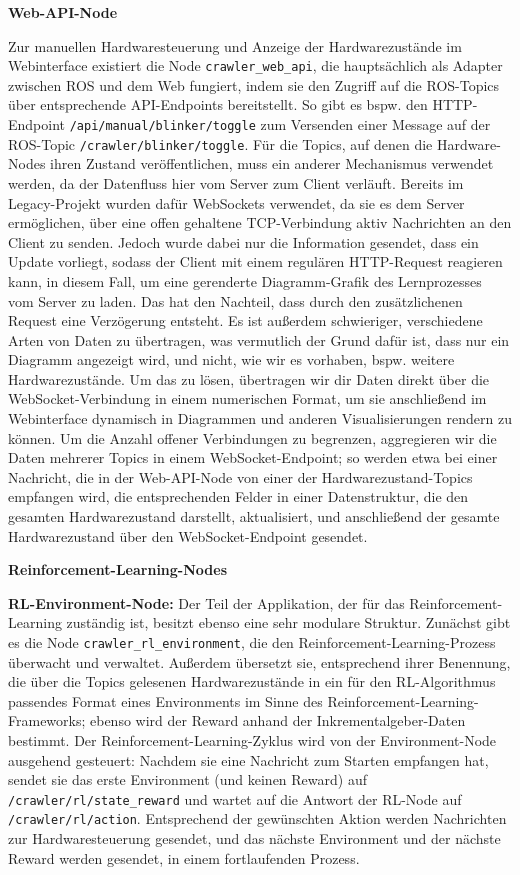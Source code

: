 \textbf{Web-API-Node}

Zur manuellen Hardwaresteuerung und Anzeige der Hardwarezustände im Webinterface existiert die Node \texttt{crawler\_web\_api}, die hauptsächlich als Adapter zwischen ROS und dem Web fungiert, indem sie den Zugriff auf die ROS-Topics über entsprechende API-Endpoints bereitstellt. So gibt es bspw. den HTTP-Endpoint \texttt{/api/manual/blinker/toggle} zum Versenden einer Message auf der ROS-Topic \texttt{/crawler/blinker/toggle}. Für die Topics, auf denen die Hardware-Nodes ihren Zustand veröffentlichen, muss ein anderer Mechanismus verwendet werden, da der Datenfluss hier vom Server zum Client verläuft. Bereits im Legacy-Projekt wurden dafür WebSockets verwendet, da sie es dem Server ermöglichen, über eine offen gehaltene TCP-Verbindung aktiv Nachrichten an den Client zu senden. Jedoch wurde dabei nur die Information gesendet, dass ein Update vorliegt, sodass der Client mit einem regulären HTTP-Request reagieren kann, in diesem Fall, um eine gerenderte Diagramm-Grafik des Lernprozesses vom Server zu laden. Das hat den Nachteil, dass durch den zusätzlichenen Request eine Verzögerung entsteht. Es ist außerdem schwieriger, verschiedene Arten von Daten zu übertragen, was vermutlich der Grund dafür ist, dass nur ein Diagramm angezeigt wird, und nicht, wie wir es vorhaben, bspw. weitere Hardwarezustände. Um das zu lösen, übertragen wir dir Daten direkt über die WebSocket-Verbindung in einem numerischen Format, um sie anschließend im Webinterface dynamisch in Diagrammen und anderen Visualisierungen rendern zu können. Um die Anzahl offener Verbindungen zu begrenzen, aggregieren wir die Daten mehrerer Topics in einem WebSocket-Endpoint; so werden etwa bei einer Nachricht, die in der Web-API-Node von einer der Hardwarezustand-Topics empfangen wird, die entsprechenden Felder in einer Datenstruktur, die den gesamten Hardwarezustand darstellt, aktualisiert, und anschließend der gesamte Hardwarezustand über den WebSocket-Endpoint gesendet. 

\textbf{Reinforcement-Learning-Nodes}

\textbf{RL-Environment-Node:} Der Teil der Applikation, der für das Reinforcement-Learning zuständig ist, besitzt ebenso eine sehr modulare Struktur. Zunächst gibt es die Node \texttt{crawler\_rl\_environment}, die den Reinforcement-Learning-Prozess überwacht und verwaltet. Außerdem übersetzt sie, entsprechend ihrer Benennung, die über die Topics gelesenen Hardwarezustände in ein für den RL-Algorithmus passendes Format eines Environments im Sinne des Reinforcement-Learning-Frameworks; ebenso wird der Reward anhand der Inkrementalgeber-Daten bestimmt. Der Reinforcement-Learning-Zyklus wird von der Environment-Node ausgehend gesteuert: Nachdem sie eine Nachricht zum Starten empfangen hat, sendet sie das erste Environment (und keinen Reward) auf \texttt{/crawler/rl/state\_reward} und wartet auf die Antwort der RL-Node auf \texttt{/crawler/rl/action}. Entsprechend der gewünschten Aktion werden Nachrichten zur Hardwaresteuerung gesendet, und das nächste Environment und der nächste Reward werden gesendet, in einem fortlaufenden Prozess. 

